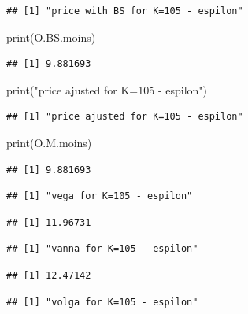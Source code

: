 \documentclass[
]{article}
\newenvironment{Shaded}{\begin{snugshade}}{\end{snugshade}}
\newcommand{\FunctionTok}[1]{\textcolor[rgb]{0.00,0.00,0.00}{#1}}
\newcommand{\NormalTok}[1]{#1}
\newcommand{\StringTok}[1]{\textcolor[rgb]{0.31,0.60,0.02}{#1}}
\begin{document}
\begin{verbatim}
## [1] "price with BS for K=105 - espilon"
\end{verbatim}

\begin{Shaded}
\begin{Highlighting}[]
\FunctionTok{print}\NormalTok{(O.BS.moins)}
\end{Highlighting}
\end{Shaded}

\begin{verbatim}
## [1] 9.881693
\end{verbatim}

\begin{Shaded}
\begin{Highlighting}[]
\FunctionTok{print}\NormalTok{(}\StringTok{"price ajusted for K=105 {-} espilon"}\NormalTok{)}
\end{Highlighting}
\end{Shaded}

\begin{verbatim}
## [1] "price ajusted for K=105 - espilon"
\end{verbatim}

\begin{Shaded}
\begin{Highlighting}[]
\FunctionTok{print}\NormalTok{(O.M.moins)}
\end{Highlighting}
\end{Shaded}

\begin{verbatim}
## [1] 9.881693
\end{verbatim}

\begin{verbatim}
## [1] "vega for K=105 - espilon"
\end{verbatim}

\begin{verbatim}
## [1] 11.96731
\end{verbatim}

\begin{verbatim}
## [1] "vanna for K=105 - espilon"
\end{verbatim}

\begin{verbatim}
## [1] 12.47142
\end{verbatim}

\begin{verbatim}
## [1] "volga for K=105 - espilon"
\end{verbatim}
\end{document}
